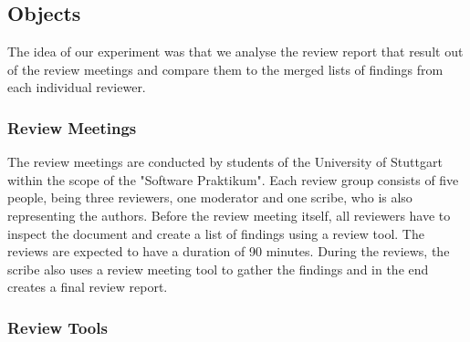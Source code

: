 \subsection{Objects}

The idea of our experiment was that we analyse the review report that result out of the review meetings and compare them to the merged lists of findings from each individual reviewer.

\subsubsection{Review Meetings}

The review meetings are conducted by students of the University of Stuttgart within the scope of the "Software Praktikum". Each review group consists of five people, being three reviewers, one moderator and one scribe, who is also representing the authors. Before the review meeting itself, all reviewers have to inspect the document and create a list of findings using a review tool. The reviews are expected to have a duration of 90 minutes. During the reviews, the scribe also uses a review meeting tool to gather the findings and in the end creates a final review report.

\subsubsection{Review Tools}


